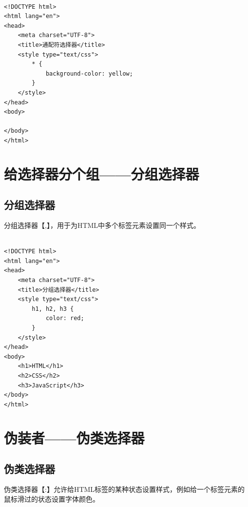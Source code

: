  \\
\begin{lstlisting}[style=htmlcssjs]
<!DOCTYPE html>
<html lang="en">
<head>
    <meta charset="UTF-8">
    <title>通配符选择器</title>
    <style type="text/css">
        * {
            background-color: yellow;
        }
    </style>
</head>
<body>

</body>
</html>
\end{lstlisting}

\newpage

\section{给选择器分个组——分组选择器}

\subsection{分组选择器}

分组选择器【,】，用于为HTML中多个标签元素设置同一个样式。 \\

 \\
\begin{lstlisting}[style=htmlcssjs]
<!DOCTYPE html>
<html lang="en">
<head>
    <meta charset="UTF-8">
    <title>分组选择器</title>
    <style type="text/css">
        h1, h2, h3 {
            color: red;
        }
    </style>
</head>
<body>
    <h1>HTML</h1>
    <h2>CSS</h2>
    <h3>JavaScript</h3>
</body>
</html>
\end{lstlisting}

\newpage

\section{伪装者——伪类选择器}

\subsection{伪类选择器}

伪类选择器【:】允许给HTML标签的某种状态设置样式，例如给一个标签元素的鼠标滑过的状态设置字体颜色。

